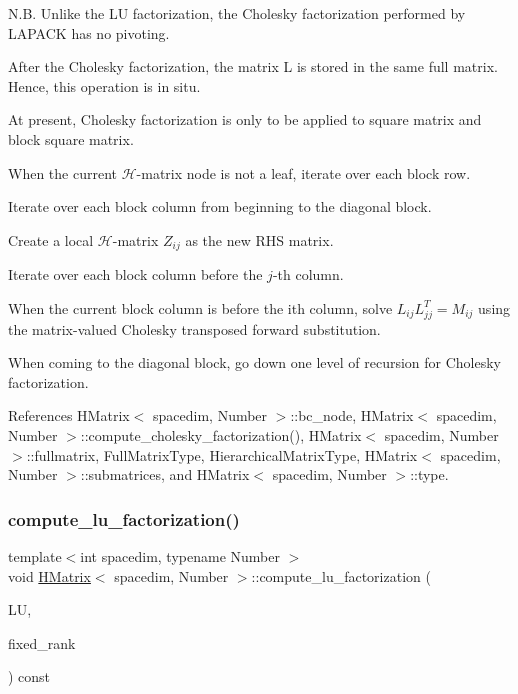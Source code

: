 N.\+B. Unlike the LU factorization, the Cholesky factorization performed by L\+A\+P\+A\+CK has no pivoting.

After the Cholesky factorization, the matrix {\ttfamily L} is stored in the same full matrix. Hence, this operation is in situ.

At present, Cholesky factorization is only to be applied to square matrix and block square matrix.

When the current $\mathcal{H}$-\/matrix node is not a leaf, iterate over each block row.

Iterate over each block column from beginning to the diagonal block.

Create a local $\mathcal{H}$-\/matrix $Z_{ij}$ as the new R\+HS matrix.

Iterate over each block column before the $j$-\/th column.

When the current block column is before the i\textquotesingle{}th column, solve $L_{ij} L_{jj}^T = M_{ij}$ using the matrix-\/valued Cholesky transposed forward substitution.

When coming to the diagonal block, go down one level of recursion for Cholesky factorization.

References H\+Matrix$<$ spacedim, Number $>$\+::bc\+\_\+node, H\+Matrix$<$ spacedim, Number $>$\+::compute\+\_\+cholesky\+\_\+factorization(), H\+Matrix$<$ spacedim, Number $>$\+::fullmatrix, Full\+Matrix\+Type, Hierarchical\+Matrix\+Type, H\+Matrix$<$ spacedim, Number $>$\+::submatrices, and H\+Matrix$<$ spacedim, Number $>$\+::type.

\mbox{\label{classHMatrix_acf95fce81ec83a759d1db8d10c3e34fb}} 
\subsubsection{\texorpdfstring{compute\+\_\+lu\+\_\+factorization()}{compute\_lu\_factorization()}\hspace{0.1cm}{\footnotesize\ttfamily [1/2]}}
{\footnotesize\ttfamily template$<$int spacedim, typename Number $>$ \\
void \hyperlink{classHMatrix}{H\+Matrix}$<$ spacedim, Number $>$\+::compute\+\_\+lu\+\_\+factorization (\begin{DoxyParamCaption}\item[{\hyperlink{classHMatrix}{H\+Matrix}$<$ spacedim, Number $>$ \&}]{LU,  }\item[{const unsigned int}]{fixed\+\_\+rank }\end{DoxyParamCaption}) const}

